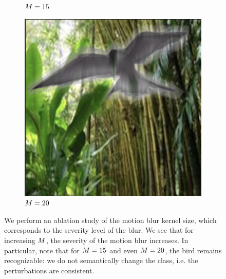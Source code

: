 \begin{figure}[!t]
\begin{subfigure}[b]{0.19\textwidth}
  \caption{$M = 15$}
  \label{fig:motion_blur_15}
\end{subfigure}
\begin{subfigure}[b]{0.19\textwidth}
  \includegraphics[width=0.99\linewidth]{plotsAistats/motion_blur_20.png}
  \caption{$M = 20$}
  \label{fig:motion_blur_20}
\end{subfigure}
\caption{We perform an ablation study of the motion blur kernel size, which corresponds to the severity level of the blur. We see that for increasing $M$, the severity of the motion blur increases. In particular, note that for $M = 15$ and even $M = 20$, the bird remains recognizable: we do not semantically change the class, i.e. the perturbations are consistent.}
\label{fig:motion_blur_panel}
\end{figure}

